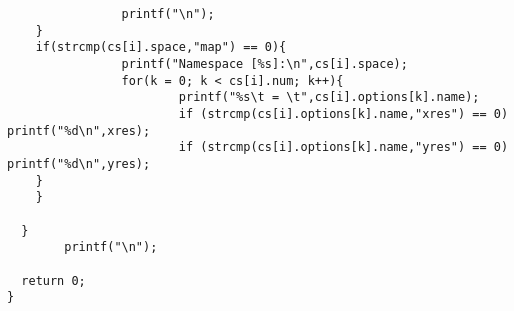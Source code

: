 \begin{DocInclude}
\begin{verbatim}
                printf("\n");
    }
    if(strcmp(cs[i].space,"map") == 0){
                printf("Namespace [%s]:\n",cs[i].space);
                for(k = 0; k < cs[i].num; k++){
                        printf("%s\t = \t",cs[i].options[k].name);
                        if (strcmp(cs[i].options[k].name,"xres") == 0) printf("%d\n",xres);
                        if (strcmp(cs[i].options[k].name,"yres") == 0) printf("%d\n",yres);
    }
    }

  }
        printf("\n");

  return 0;
}

\end{verbatim}
\end{DocInclude}
 